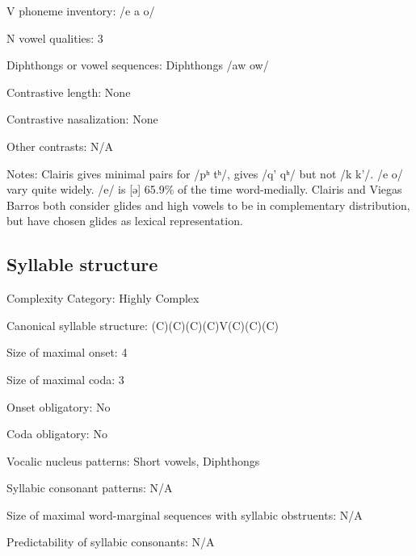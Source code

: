 {\begin{appendixdesc}
\item[V phoneme inventory:] /e a o/

\item[N vowel qualities:] 3

\item[Diphthongs or vowel sequences:] Diphthongs /aw ow/

\item[Contrastive length:] None

\item[Contrastive nasalization:] None

\item[Other contrasts:] N/A

\item[Notes:] Clairis gives minimal pairs for /pʰ tʰ/, gives /q’ qʰ/ but not /k k’/. /e o/ vary quite widely. /e/ is [ə] 65.9\% of the time word-medially. Clairis and Viegas Barros both consider glides and high vowels to be in complementary distribution, but have chosen glides as lexical representation.
\end{appendixdesc}
\subsection*{Syllable structure}
\begin{appendixdesc}
\item[Complexity Category:] Highly Complex

\item[Canonical syllable structure:] (C)(C)(C)(C)V(C)(C)(C) \citep[391--401]{Clairis1985}

\item[Size of maximal onset:] 4

\item[Size of maximal coda:] 3

\item[Onset obligatory:] No

\item[Coda obligatory:] No

\item[Vocalic nucleus patterns:] Short vowels, Diphthongs

\item[Syllabic consonant patterns:] N/A

\item[Size of maximal word-marginal sequences with syllabic obstruents:] N/A

\item[Predictability of syllabic consonants:] N/A 


\end{appendixdesc}}
